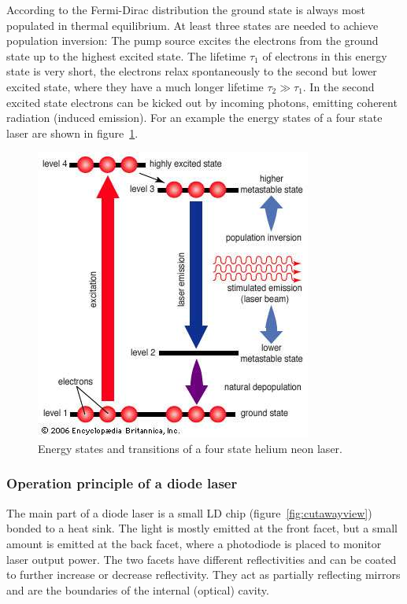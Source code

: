 According to the Fermi-Dirac distribution the ground state is always most populated in thermal
equilibrium.
At least three states are needed to achieve population inversion: The pump source excites the electrons from
the ground state up to the highest excited state.
The lifetime $\tau_1$ of electrons in this energy state is very short, the electrons relax
spontaneously to the second but lower excited state, where they have a much longer lifetime
$\tau_2 \gg \tau_1$.
In the second excited state electrons can be kicked out by incoming photons, emitting coherent
radiation (induced emission).
For an example the energy states of a four state laser are shown in
figure~\ref{fig:four_state_laser}.
\begin{figure}[ht]
  \centering
  \includegraphics[width=0.6\linewidth]{content/pictures/four_state_laser.jpg}
  \caption{Energy states and transitions of a four state helium neon laser\cite{four_state_laser}.}%
  \label{fig:four_state_laser}
\end{figure}

\subsubsection{Operation principle of a diode laser}\label{sub:diode-laser}
The main part of a diode laser is a small LD chip (figure~\ref{fig:cutawayview}) bonded to a heat sink.
The light is mostly emitted at the front facet, but a small amount is emitted at the back facet,
where a photodiode is placed to monitor laser output power.
The two facets have different reflectivities and can be coated to further increase or decrease
reflectivity.
They act as partially reflecting mirrors and are the boundaries of the internal (optical) cavity.

